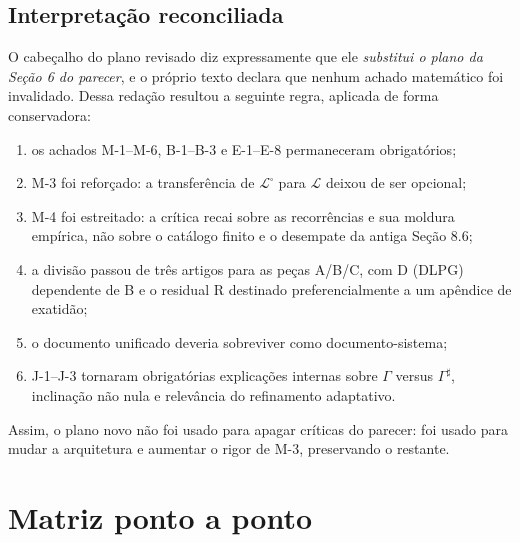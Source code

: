 \documentclass[11pt,a4paper]{article}
\newcommand{\Library}{\mathcal L}
\newcommand{\LibraryMarked}{\mathcal L^{\square}}
\begin{document}
\subsection{Interpretação reconciliada}

O cabeçalho do plano revisado diz expressamente que ele \emph{substitui o plano da
Seção 6 do parecer}, e o próprio texto declara que nenhum achado matemático foi
invalidado. Dessa redação resultou a seguinte regra, aplicada de forma conservadora:

\begin{enumerate}
  \item os achados M-1--M-6, B-1--B-3 e E-1--E-8 permaneceram obrigatórios;
  \item M-3 foi reforçado: a transferência de $\LibraryMarked$ para $\Library$ deixou de
  ser opcional;
  \item M-4 foi estreitado: a crítica recai sobre as recorrências e sua moldura empírica,
  não sobre o catálogo finito e o desempate da antiga Seção 8.6;
  \item a divisão passou de três artigos para as peças A/B/C, com D (DLPG) dependente de
  B e o residual R destinado preferencialmente a um apêndice de exatidão;
  \item o documento unificado deveria sobreviver como documento-sistema;
  \item J-1--J-3 tornaram obrigatórias explicações internas sobre $\Gamma$ versus
  $\Gamma^\sharp$, inclinação não nula e relevância do refinamento adaptativo.
\end{enumerate}

Assim, o plano novo não foi usado para apagar críticas do parecer: foi usado para mudar
a arquitetura e aumentar o rigor de M-3, preservando o restante.

\section{Matriz ponto a ponto}
\end{document}
